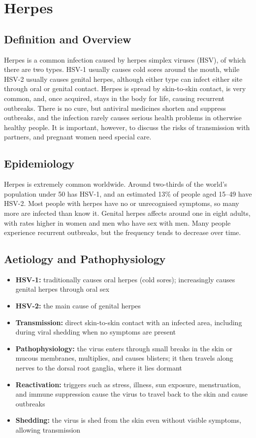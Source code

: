 \chapter{Herpes}

\section*{Definition and Overview}
Herpes is a common infection caused by herpes simplex viruses (HSV), of which there are two types. HSV-1 usually causes cold sores around the mouth, while HSV-2 usually causes genital herpes, although either type can infect either site through oral or genital contact. Herpes is spread by skin-to-skin contact, is very common, and, once acquired, stays in the body for life, causing recurrent outbreaks. There is no cure, but antiviral medicines shorten and suppress outbreaks, and the infection rarely causes serious health problems in otherwise healthy people. It is important, however, to discuss the risks of transmission with partners, and pregnant women need special care.

\section*{Epidemiology}
Herpes is extremely common worldwide. Around two-thirds of the world's population under 50 has HSV-1, and an estimated 13\% of people aged 15--49 have HSV-2. Most people with herpes have no or unrecognised symptoms, so many more are infected than know it. Genital herpes affects around one in eight adults, with rates higher in women and men who have sex with men. Many people experience recurrent outbreaks, but the frequency tends to decrease over time.

\section*{Aetiology and Pathophysiology}
\begin{itemize}
    \item \textbf{HSV-1:} traditionally causes oral herpes (cold sores); increasingly causes genital herpes through oral sex
    \item \textbf{HSV-2:} the main cause of genital herpes
    \item \textbf{Transmission:} direct skin-to-skin contact with an infected area, including during viral shedding when no symptoms are present
    \item \textbf{Pathophysiology:} the virus enters through small breaks in the skin or mucous membranes, multiplies, and causes blisters; it then travels along nerves to the dorsal root ganglia, where it lies dormant
    \item \textbf{Reactivation:} triggers such as stress, illness, sun exposure, menstruation, and immune suppression cause the virus to travel back to the skin and cause outbreaks
    \item \textbf{Shedding:} the virus is shed from the skin even without visible symptoms, allowing transmission
\end{itemize}

